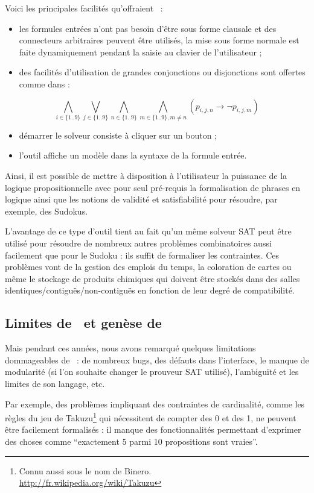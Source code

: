 Voici les principales facilités qu'offraient \satoulouse\ :
\begin{itemize}
\item les formules entrées n'ont pas besoin d'être sous forme clausale et des connecteurs arbitraires peuvent être utilisés, la mise sous forme normale est faite dynamiquement pendant la saisie au clavier de l'utilisateur ;
\item des facilités d'utilisation de grandes conjonctions ou disjonctions sont offertes comme dans :
\end{itemize}
  \[\bigwedge_{i\in\{1..9\}}
  \bigvee_{j\in\{1..9\}}\bigwedge_{n\in\{1..9\}}\bigwedge_{m\in\{1..9\},m\neq
    n}(p_{i,j,n}\rightarrow \lnot p_{i,j,m})\]
\begin{itemize}
\item démarrer le solveur consiste à cliquer sur un bouton ;
\item l'outil affiche un modèle dans la syntaxe de la formule entrée.
\end{itemize}
Ainsi, il est possible de mettre à disposition à l'utilisateur la puissance de la logique propositionnelle avec pour seul pré-requis la formalisation de phrases en logique ainsi que les notions de validité et satisfiabilité pour résoudre, par exemple, des Sudokus.\

L'avantage de ce type d'outil tient au fait qu'un même solveur SAT peut être utilisé pour résoudre de nombreux autres problèmes combinatoires aussi facilement que pour le Sudoku : ils suffit de formaliser les contraintes. Ces problèmes vont de la gestion des emplois du temps, la coloration de cartes ou même le stockage de produits chimiques qui doivent être stockés dans des salles identiques/contiguës/non-contiguës en fonction de leur degré de compatibilité.

\subsection{Limites de \satoulouse\ et genèse de \nameTool}
Mais pendant ces années, nous avons remarqué quelques limitations dommageables de \satoulouse\ : de nombreux bugs, des défauts dans l'interface, le manque de modularité (si l'on souhaite changer le prouveur SAT utilisé), l'ambiguïté et les limites de son langage, etc.

Par exemple, des problèmes impliquant des contraintes de cardinalité, comme les règles du jeu de Takuzu\footnote{Connu aussi sous le nom de Binero.\\ \url{http://fr.wikipedia.org/wiki/Takuzu}} qui nécessitent de compter des 0 et des 1, ne peuvent être facilement formalisés : il manque des fonctionnalités permettant d'exprimer des choses comme ``exactement 5 parmi 10 propositions sont vraies''. 

